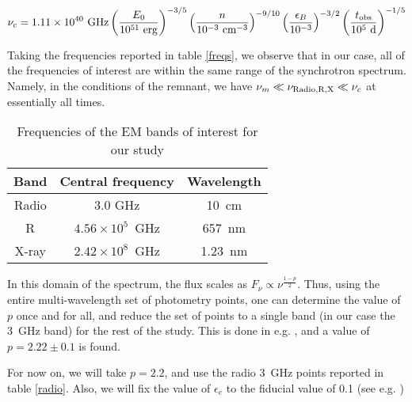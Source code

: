 $$\nu_c = 1.11 \times 10^{40}~\rm{GHz} \left(\frac{E_0}{10^{51}~\rm{erg}} \right)^{-3/5} \left(\frac{n}{10^{-3}~\rm{cm}^{-3}} \right)^{-9/10} \left(\frac{\epsilon_B}{10^{-3}} \right)^{-3/2} \left(\frac{t_{\rm{obs}}}{10^5~\rm{d}} \right)^{-1/5} $$


Taking the frequencies reported in table \ref{freqs}, we observe that in our case, all of the frequencies of interest are within the same range of the synchrotron spectrum. Namely, in the conditions of the remnant, we have $\nu_m \ll \nu_{\rm{Radio, R, X}} \ll \nu_c$ at essentially all times.

\begin{table}
\begin{center}
\begin{tabular}{c|c|c}
\bf{Band} & \bf{Central frequency} & \bf{Wavelength}\\
\hline
Radio & 3.0 GHz & 10~cm\\
R & $4.56\times 10^5$~GHz & 657~nm \\
X-ray & $2.42\times 10^8$~GHz & 1.23~nm \\

\end{tabular}
\caption{Frequencies of the EM bands of interest for our study}
\label{freq}
\end{center}
\end{table}

In this domain of the spectrum, the flux scales as $F_\nu \propto \nu^{\frac{1 - p}{2}}$. Thus, using the entire multi-wavelength set of photometry points, one can determine the value of $p$ once and for all, and reduce the set of points to a single band (in our case the 3~GHz band) for the rest of the study. This is done in e.g. \cite{5}, and a value of $p = 2.22\pm0.1$ is found. 

For now on, we will take $p = 2.2$, and use the radio 3~GHz points reported in table \ref{radio}. Also, we will fix the value of $\epsilon_e$ to the fiducial value of 0.1 (see e.g. \cite{41})

